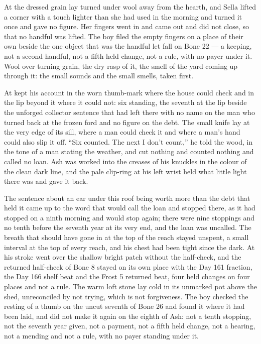At  the dressed grain lay turned under wool away from the hearth, and Sella lifted a corner with a touch lighter than she had used in the morning and turned it once and gave no figure. Her fingers went in and came out and did not close, so that no handful was lifted. The boy filed the empty fingers on a place of their own beside the one object that was the handful let fall on Bone 22 --- a keeping, not a second handful, not a fifth held change, not a rule, with no payer under it. Wool over turning grain, the dry rasp of it, the smell of the yard coming up through it: the small sounds and the small smells, taken first.

At   kept his account in the worn thumb-mark where the house could check and in the lip beyond it where it could not: six standing, the seventh at the lip beside the unforged collector sentence that  had left there with no name on the man who turned back at the frozen ford and no figure on the debt. The small knife lay at the very edge of its sill, where a man could check it and where a man's hand could also slip it off. “Six counted. The next I don't count,” he told the wood, in the tone of a man stating the weather, and cut nothing and counted nothing and called no loan. Ash was worked into the creases of his knuckles in the colour of the clean dark line, and the pale clip-ring at his left wrist held what little light there was and gave it back.

The sentence about an ear under this roof being worth more than the debt that held it came up to the word that would call the loan and stopped there, as it had stopped on a ninth morning and would stop again; there were nine stoppings and no tenth before the seventh year at its very end, and the loan was uncalled. The breath that should have gone in at the top of the reach stayed unspent, a small interval at the top of every reach, and his chest had been tight since the dark. At  his stroke went over the shallow bright patch without the half-check, and the returned half-check of Bone 8 stayed on its own place with the Day 161 fraction, the Day 166 shelf beat and the Frost 5 returned beat, four held changes on four places and not a rule. The warm loft stone lay cold in its unmarked pot above the shed, unreconciled by not trying, which is not forgiveness. The boy checked the resting of a thumb on the uncut seventh of Bone 26 and found it where it had been laid, and did not make it again on the eighth of Ash: not a tenth stopping, not the seventh year given, not a payment, not a fifth held change, not a hearing, not a mending and not a rule, with no payer standing under it.


